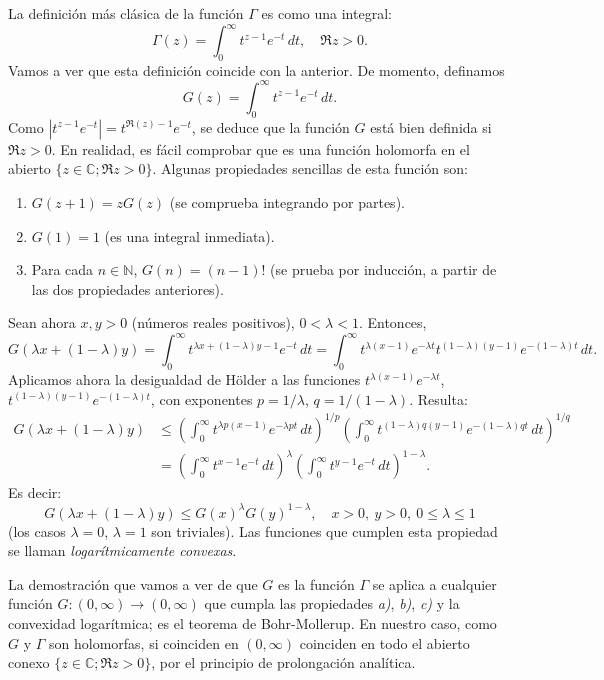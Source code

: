 \documentclass[11pt]{book}
\theoremstyle{plain} %
\theoremstyle{definition} %
\newcommand\N{\mathbb{N}}
\newcommand\C{\mathbb{C}}
\begin{document}
La definición más clásica de la función $\Gamma$ es como una integral:
\[
   \Gamma(z) = \int_0^\infty t^{z-1} e^{-t} \, dt,
   \quad \Re z > 0.
\]
Vamos a ver que esta definición coincide con la anterior. De momento, definamos
\[
   G(z) = \int_0^\infty t^{z-1} e^{-t} \, dt.
\]
Como $|t^{z-1} e^{-t}| = t^{\Re(z)-1} e^{-t}$, se deduce que la función $G$ está 
bien definida si $\Re z > 0$. En realidad, es fácil comprobar que es una función 
holomorfa en el abierto $\{z \in \C; \Re z > 0\}$. 
Algunas propiedades sencillas de esta función son:
\begin{enumerate}
\item[a)] $G(z+1) = z G(z)$ (se comprueba integrando por partes).
\item[b)] $G(1) = 1$ (es una integral inmediata).
\item[c)] Para cada $n \in \N$, $G(n) = (n-1)!$ (se prueba por inducción, a 
partir de las dos propiedades anteriores).
\end{enumerate}
Sean ahora $x, y > 0$ (números reales positivos), $0 < \lambda < 1$. Entonces,
\[
   G(\lambda x + (1-\lambda)y)
   = \int_0^\infty t^{\lambda x + (1-\lambda)y - 1} e^{-t} \, dt
   = \int_0^\infty t^{\lambda (x-1)} e^{-\lambda t}
   t^{(1-\lambda)(y-1)} e^{-(1-\lambda)t} \, dt.
\]
Aplicamos ahora la desigualdad de Hölder a las 
funciones $t^{\lambda (x-1)} e^{-\lambda t}$, $t^{(1-\lambda)(y-1)} e^{-(1-
\lambda)t}$, con exponentes $p = 1/\lambda$, $q = 1/(1-\lambda)$. Resulta:
\begin{align*}
   G(\lambda x + (1-\lambda)y)
   &\leq \left(\int_0^\infty t^{\lambda p (x-1)} e^{-\lambda p t}
   \, dt \right)^{1/p}
   \left(\int_0^\infty t^{(1-\lambda) q (y-1)} e^{-(1-\lambda) qt}
   \, dt \right)^{1/q}
   \\
   &= \left(\int_0^\infty t^{x-1} e^{-t} \, dt \right)^\lambda
   \left(\int_0^\infty t^{y-1} e^{-t} \, dt \right)^{1-\lambda}.
\end{align*}
Es decir:
\[
   G(\lambda x + (1-\lambda)y) \leq G(x)^\lambda G(y)^{1-\lambda},
   \quad x > 0, \ y > 0, \ 0 \leq \lambda \leq 1
\]
(los casos $\lambda = 0$, $\lambda = 1$ son triviales). Las funciones que cumplen 
esta propiedad se llaman 
\emph{logarítmicamente convexas}.

La demostración que vamos a ver de que $G$ es la función $\Gamma$ se aplica a 
cualquier función $G : (0,\infty) \to (0,\infty)$ que cumpla las propiedades 
\emph{a)}, \emph{b)}, \emph{c)} y la convexidad logarítmica; es el teorema de 
Bohr-Mollerup. En nuestro caso, como $G$ y $
\Gamma$ son holomorfas, si coinciden en $(0,\infty)$ coinciden en todo el abierto 
conexo $\{z \in \C; \Re z > 0\}$, por el principio de prolongación 
analítica.
\end{document}

